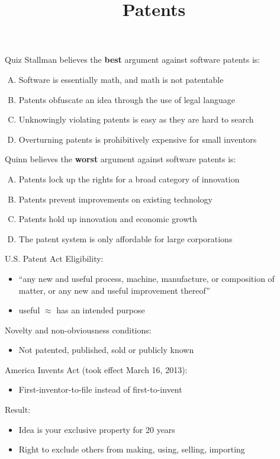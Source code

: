 \documentclass{beamer}
\title{Patents}
\date{}
\begin{document}
\begin{frame}
\titlepage
\end{frame}

\begin{frame}{Quiz}
Stallman believes the \textbf{best} argument against software patents is:
\begin{enumerate}[(A)]
\item<1-2> Software is essentially math, and math is not patentable
\item<1> Patents obfuscate an idea through the use of legal language
\item<1> Unknowingly violating patents is easy as they are hard to search
\item<1> Overturning patents is prohibitively expensive for small inventors
\end{enumerate}
\bigskip
Quinn believes the \textbf{worst} argument against software patents is:
\begin{enumerate}[(A)]
\item<1-2> Patents lock up the rights for a broad category of innovation
\item<1> Patents prevent improvements on existing technology
\item<1> Patents hold up innovation and economic growth
\item<1> The patent system is only affordable for large corporations
\end{enumerate}
\end{frame}

\begin{frame}{U.S. Patent Act}
Eligibility:
\begin{itemize}
\item ``any new and useful process, machine, manufacture, or composition of matter, or any new and useful improvement thereof''
\item useful $\approx$ has an intended purpose
\end{itemize}
Novelty and non-obviousness conditions:
\begin{itemize}
\item Not patented, published, sold or publicly known
\end{itemize}
America Invents Act (took effect March 16, 2013):
\begin{itemize}
\item First-inventor-to-file instead of first-to-invent
\end{itemize}
\bigskip
Result:
\begin{itemize}
\item Idea is your exclusive property for 20 years
\item Right to exclude others from making, using, selling, importing
\end{itemize}
\end{frame}
\end{document}

